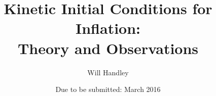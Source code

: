 \title{Kinetic Initial Conditions for Inflation:\\ Theory and Observations}

\author{Will Handley}
\date{Due to be submitted: March 2016}

\maketitle
\cleardoublepage{}
